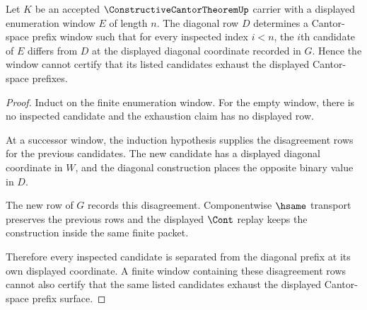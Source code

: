 \begin{theorem}
\label{thm:constructive-cantor-no-enumeration-window}
Let $K$ be an accepted $\ConstructiveCantorTheoremUp$ carrier with a displayed enumeration window $E$ of length $n$. The diagonal row $D$ determines a Cantor-space prefix window such that for every inspected index $i<n$, the $i$th candidate of $E$ differs from $D$ at the displayed diagonal coordinate recorded in $G$. Hence the window cannot certify that its listed candidates exhaust the displayed Cantor-space prefixes.
\end{theorem}
\begin{proof}
Induct on the finite enumeration window. For the empty window, there is no inspected candidate and the exhaustion claim has no displayed row.

At a successor window, the induction hypothesis supplies the disagreement rows for the previous candidates. The new candidate has a displayed diagonal coordinate in $W$, and the diagonal construction places the opposite binary value in $D$.

The new row of $G$ records this disagreement. Componentwise $\hsame$ transport preserves the previous rows and the displayed $\Cont$ replay keeps the construction inside the same finite packet.

Therefore every inspected candidate is separated from the diagonal prefix at its own displayed coordinate. A finite window containing these disagreement rows cannot also certify that the same listed candidates exhaust the displayed Cantor-space prefix surface.
\end{proof}

